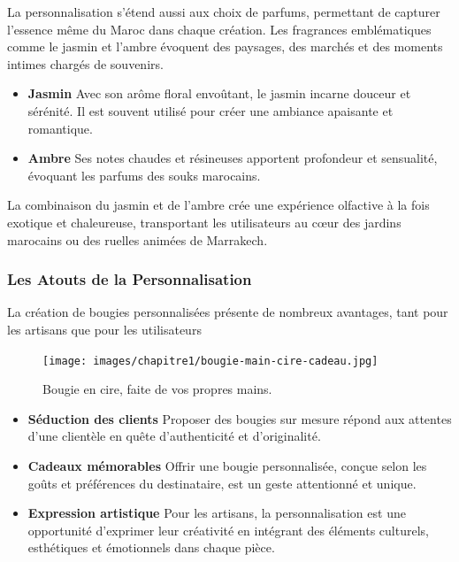 \documentclass[11pt,fleqn,onecolumn,oneside]{book}
\begin{document}
La personnalisation s’étend aussi aux choix de parfums, permettant de capturer l’essence même du Maroc dans chaque création. Les fragrances emblématiques comme le jasmin et l’ambre évoquent des paysages, des marchés et des moments intimes chargés de souvenirs.

\begin{itemize}
    \item \textbf{Jasmin} Avec son arôme floral envoûtant, le jasmin incarne douceur et sérénité. Il est souvent utilisé pour créer une ambiance apaisante et romantique.
    \item \textbf{Ambre} Ses notes chaudes et résineuses apportent profondeur et sensualité, évoquant les parfums des souks marocains.
\end{itemize}

\begin{remark}
La combinaison du jasmin et de l’ambre crée une expérience olfactive à la fois exotique et chaleureuse, transportant les utilisateurs au cœur des jardins marocains ou des ruelles animées de Marrakech.
\end{remark}

\subsubsection*{Les Atouts de la Personnalisation}

La création de bougies personnalisées présente de nombreux avantages, tant pour les artisans que pour les utilisateurs

\begin{figure}[htbp]
    \centering
    \texttt{[image: images/chapitre1/bougie-main-cire-cadeau.jpg]}
    \caption{Bougie en cire, faite de vos propres mains.}
    \label{fig:cedrus_atlantica}
\end{figure}


\begin{itemize}
    \item \textbf{Séduction des clients} Proposer des bougies sur mesure répond aux attentes d’une clientèle en quête d’authenticité et d’originalité.
    \item \textbf{Cadeaux mémorables} Offrir une bougie personnalisée, conçue selon les goûts et préférences du destinataire, est un geste attentionné et unique.
    \item \textbf{Expression artistique} Pour les artisans, la personnalisation est une opportunité d’exprimer leur créativité en intégrant des éléments culturels, esthétiques et émotionnels dans chaque pièce.
\end{itemize}
\end{document}
